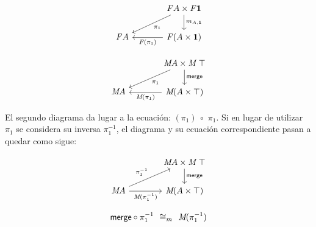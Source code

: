 \begin{multicols}{2}
\begin{equation}\label{diagrama1}
\begin{tikzcd}[column sep = large]
& \mathit{F} A \times \mathit{F} \mathbf{1} \arrow[d, "m_{A,\mathbf{1}}"] \arrow[dl, "\pi_1"]  \\
\mathit{F} A & \mathit{F} (A \times \mathbf{1}) \arrow[l, "\mathit{F}(\pi_1)"]
\end{tikzcd}
\end{equation}

\begin{equation}\label{diagrama2}
\begin{tikzcd}[column sep = large]
& \AgdaBound{M} A \times \AgdaBound{M} \ \AgdaDatatype{$\top$} \arrow[d, "\AgdaField{merge}"] \arrow[dl, "\pi_1"]  \\
\AgdaBound{M} A & \AgdaBound{M} (A \times \AgdaDatatype{$\top$}) \arrow[l, "\AgdaBound{M}(\pi_1)"]
\end{tikzcd}
\end{equation}
\end{multicols}

El segundo diagrama da lugar a la ecuación: $(\pi_1) \ \circ$   $\pi_1$. Si en lugar de utilizar $\pi_1$ se considera su inversa $\pi_1^{-1}$, el diagrama y su ecuación correspondiente pasan a quedar como sigue:
\vspace{-1.25\baselineskip}

\begin{multicols}{2}
\begin{equation}\label{diagrama3}
\begin{tikzcd}[column sep = large]
& \AgdaBound{M} A \times \AgdaBound{M} \ \AgdaDatatype{$\top$} \arrow[d, "\AgdaField{merge}"]  \\
\AgdaBound{M} A \arrow[ur, "\pi_1^{-1}"] \arrow{r}[below]{\AgdaBound{M}(\pi_1^{-1})} & \AgdaBound{M} (A \times \AgdaDatatype{$\top$}) 
\end{tikzcd}
\end{equation}

\vspace*{\fill}
\begin{equation}
\AgdaField{merge} \circ \pi_1^{-1} \ \ \AgdaField{$\cong_m$} \ \ \AgdaBound{M} (\pi_1^{-1}) 
\end{equation}
\vspace*{\fill}
\end{multicols}

